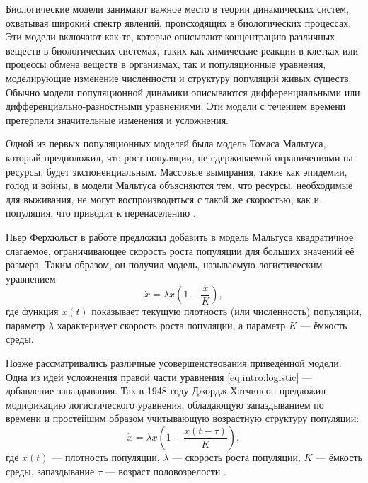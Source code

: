 
{\actuality} Биологические модели занимают важное место в теории динамических систем, охватывая широкий спектр явлений, происходящих в биологических процессах. Эти модели включают как те, которые описывают концентрацию различных веществ в биологических системах, таких как химические реакции в клетках или процессы обмена веществ в организмах, так и популяционные уравнения, моделирующие изменение численности и структуру популяций живых существ. Обычно модели популяционной динамики описываются дифференциальными или дифференциально-разностными уравнениями. 
Эти модели с течением времени претерпели значительные изменения и усложнения.

Одной из первых популяционных моделей была модель Томаса Мальтуса, который предположил, что рост популяции, не сдерживаемой ограничениями на ресурсы, будет экспоненциальным. Массовые вымирания, такие как эпидемии, голод и войны, в модели Мальтуса объясняются тем, что ресурсы, необходимые для выживания, не могут воспроизводиться с такой же скоростью, как и популяция, что приводит к перенаселению \cite{Malthus1798}.

Пьер Ферхюльст в работе \cite{Verhulst1838} предложил добавить в модель Мальтуса квадратичное слагаемое, ограничивающее скорость роста популяции для больших значений её размера. Таким образом, он получил модель, называемую логистическим уравнением
\begin{equation}
\label{eq:intro:logistic}
	\dot{x}=\lambda x\left(1-\frac{x}{K}\right),
\end{equation}
где функция $x(t)$ показывает текущую плотность (или численность) популяции, параметр $\lambda$ характеризует скорость роста популяции, а параметр $K$ --- ёмкость среды.

Позже рассматривались различные усовершенствования приведённой модели. Одна из идей усложнения правой части уравнения \eqref{eq:intro:logistic} --- добавление запаздывания. Так в 1948 году Джордж Хатчинсон предложил модификацию логистического уравнения, обладающую запаздыванием по времени и простейшим образом учитывающую возрастную структуру популяции:
%
\begin{equation}
\label{eq:intro:hutch}
	\dot{x}=\lambda x\left(1 - \frac{x(t-\tau)}{K}\right),
\end{equation}
%
где $x(t)$ --- плотность популяции, $\lambda$ --- скорость роста популяции, $K$ --- ёмкость среды, запаздывание $\tau$ --- возраст половозрелости \cite{Hutchinson1948}. %

